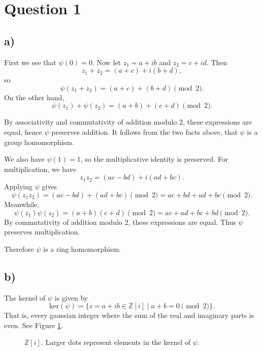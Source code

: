 \documentclass[a4paper,12pt]{article}
\begin{document}
\section*{Question 1}

\subsection*{a)}

First we see that $\psi(0) = 0$. Now let $z_1=a+ib$ and $z_2=c+id$. Then
\[
z_1+z_2=(a+c)+i(b+d),
\]
so
\[
\psi(z_1+z_2)= (a+c)+(b+d) \pmod 2.
\]
On the other hand,
\[
\psi(z_1)+\psi(z_2) = (a+b)+(c+d) \pmod 2.
\]

By associativity and commutativity of addition modulo 2, these expressions are equal, hence $\psi$ preserves addition. It follows from the two facts above, that $\psi$ is a group homomorphism.

We also have $\psi(1)=1$, so the multiplicative identity is preserved. For multiplication, we have
\[
z_1 z_2 = (ac - bd) + i(ad + bc).
\]
Applying $\psi$ gives
\[
\psi(z_1 z_2) = (ac - bd) + (ad + bc) \pmod 2
= ac + bd + ad + bc \pmod 2.
\]
Meanwhile,
\[
\psi(z_1)\psi(z_2) = (a+b)(c+d) \pmod 2
= ac + ad + bc + bd \pmod 2.
\]
By commutativity of addition modulo 2, these expressions are equal. Thus $\psi$ preserves multiplication. 



Therefore $\psi$ is a ring homomorphism.

\subsection*{b)}
The kernel of $\psi$ is given by
\[
\mathrm{ker}(\psi) = \{ z = a+ib \in \mathbb{Z}[i] \mid a + b = 0 \pmod{2} \}.
\]
That is, every gaussian integer where the sum of the real and imaginary parts is even. See Figure \ref{fig:gaussian_integers}.


\begin{figure}[h]
    \centering


    \caption{$\mathbb{Z}[i]$. Larger dots represent elements in the kernel of $\psi$.}
    \label{fig:gaussian_integers}
\end{figure}
\end{document}

